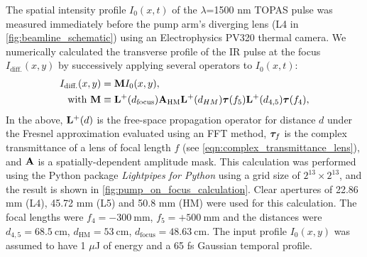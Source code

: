 The spatial intensity profile $I_0(x,t)$ of the $\lambda$=1500 nm TOPAS pulse was measured immediately before the pump arm's diverging lens (L4 in \cref{fig:beamline_schematic}) using an Electrophysics PV320 thermal camera. We numerically calculated the transverse profile of the IR pulse at the focus $I_{\textrm{diff.}}(x,y)$ by successively applying several operators to $I_0(x,t)$:
\begin{equation}
\begin{aligned}
I_{\textrm{diff.}}(x,y) &= \vb{M} I_0(x,y), \\
\textrm{with} \ \vb{M} &\equiv \vb{L^+}(d_{\textrm{focus}}) \vb{A}_{\textrm{HM}} \vb{L^+}(d_{HM}) \vb*{\tau}(f_5) \vb{L^+}(d_{4,5}) \vb*{\tau}(f_4),
\end{aligned}
\label{eqn:IR_transverse_int_profile}
\end{equation}
In the above, $\vb{L^+}(d)$ is the free-space propagation operator for distance $d$ under the Fresnel approximation evaluated using an FFT method, $\vb*{\tau}_f$ is the complex transmittance of a lens of focal length $f$ (see \cref{eqn:complex_transmittance_lens}), and $\vb{A}$ is a spatially-dependent amplitude mask. This calculation was performed using the Python package \textit{Lightpipes for Python} \cite{vdovinLightPipesPython} using a grid size of $2^{13}\times2^{13}$, and the result is shown in \cref{fig:pump_on_focus_calculation}. Clear apertures of 22.86 mm (L4), 45.72 mm (L5) and 50.8 mm (HM) were used for this calculation. The focal lengths were $f_4 = -300 \ \textrm{mm}$, $f_5 = + 500 \ \textrm{mm}$ and the distances were $d_{4,5} = 68.5 \ \textrm{cm}$, $d_{\textrm{HM}} = 53 \ \textrm{cm}$, $d_{\textrm{focus}} = 48.63 \ \textrm{cm}$. The input profile $I_0(x,y)$ was assumed to have 1 $\mu$J of energy and a 65 fs Gaussian temporal profile.



